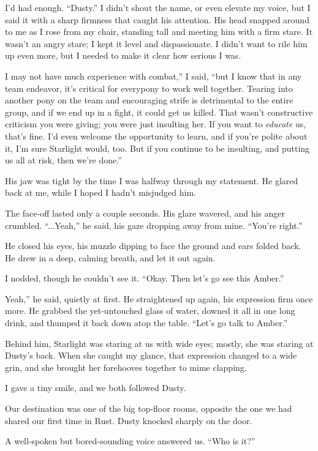 I’d had enough. “Dusty.” I didn’t shout the name, or even elevate my voice, but I said it with a sharp firmness that caught his attention. His head snapped around to me as I rose from my chair, standing tall and meeting him with a firm stare. It wasn’t an angry stare; I kept it level and dispassionate. I didn’t want to rile him up even more, but I needed to make it clear how serious I was.

\leavevmode{}I may not have much experience with combat,” I said, “but I know that in any team endeavor, it’s critical for everypony to work well together. Tearing into another pony on the team and encouraging strife is detrimental to the entire group, and if we end up in a fight, it could get us killed. That wasn’t constructive criticism you were giving; you were just insulting her. If you want to \textit{educate} us, that’s fine. I’d even welcome the opportunity to learn, and if you’re polite about it, I’m sure Starlight would, too. But if you continue to be insulting, and putting us all at risk, then we’re done.”

His jaw was tight by the time I was halfway through my statement. He glared back at me, while I hoped I hadn’t misjudged him.

The face-off lasted only a couple seconds. His glare wavered, and his anger crumbled. “...Yeah,” he said, his gaze dropping away from mine. “You’re right.”

He closed his eyes, his muzzle dipping to face the ground and ears folded back. He drew in a deep, calming breath, and let it out again.

I nodded, though he couldn’t see it. “Okay. Then let’s go see this Amber.”

\leavevmode{}Yeah,” he said, quietly at first. He straightened up again, his expression firm once more. He grabbed the yet-untouched glass of water, downed it all in one long drink, and thumped it back down atop the table. “Let’s go talk to Amber.”

Behind him, Starlight was staring at us with wide eyes; mostly, she was staring at Dusty’s back. When she caught my glance, that expression changed to a wide grin, and she brought her forehooves together to mime clapping.

I gave a tiny smile, and we both followed Dusty.

Our destination was one of the big top-floor rooms, opposite the one we had shared our first time in Rust. Dusty knocked sharply on the door.

A well-spoken but bored-sounding voice answered us. “Who is it?”

